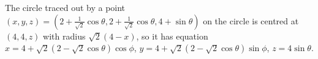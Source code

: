 \begin{solution}
The circle traced out by a point $(x,y,z)=(2+\frac1{\sqrt2}\cos\theta,2+\frac{1}{\sqrt 2} \cos \theta,4+\sin\theta)$ on the circle is centred at $(4,4,z)$ with radius $\sqrt2(4-x)$, so it has equation $x=4+\sqrt2(2-\sqrt2\cos\theta)\cos\phi$, $y=4+\sqrt2(2-\sqrt2\cos\theta)\sin\phi$, $z=4\sin\theta$.
\end{solution}



%
